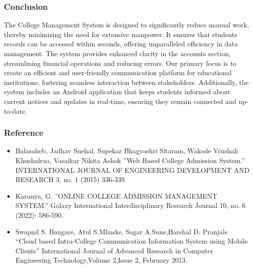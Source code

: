 \justifying 
\newpage 
\subsubsection{Conclusion}
\newline
 The College Management System is designed to significantly reduce manual work, thereby minimizing the need for extensive manpower. It ensures that students records can be accessed within seconds, offering unparalleled efficiency in data management. The system provides enhanced clarity in the accounts section, streamlining financial operations and reducing errors. Our primary focus is to create an efficient and user-friendly communication platform for educational institutions, fostering seamless interaction between stakeholders. Additionally, the system includes an Android application that keeps students informed about current notices and updates in real-time, ensuring they remain connected and up-to-date.


\newpage 
\subsubsection{Reference}


\begin{itemize}
    \item Balasaheb, Jadhav Snehal, Supekar
Bhagyashri Sitaram, Wakode Vrushali Khushalrao,
Vasaikar Nikita Ashok ”Web Based College Admission
System.” INTERNATIONAL JOURNAL OF
ENGINEERING DEVELOPMENT AND RESEARCH 3,
no. 1 (2015) 336-339.
\end{itemize}
\begin{itemize}
    \item Karunya, G. ”ONLINE COLLEGE ADMISSION
MANAGEMENT SYSTEM.” Galaxy International
Interdisciplinary Research Journal 10, no. 6 (2022):
586-590.

\end{itemize}
\begin{itemize}
    \item Swapnil S. Bangare, Atul S.Mhaske, Sagar A.Sune,Harshal
D. Pranjale “Cloud based Intra-College Communication
Information System using Mobile Clients” International
Journal of Advanced Research in Computer Engineering
Technology,Volume 2,Issue 2, February 2013.
\end{itemize}